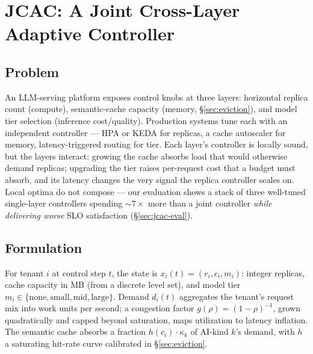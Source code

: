 
\section{JCAC: A Joint Cross-Layer Adaptive Controller}
\label{sec:jcac}

\subsection{Problem}
An LLM-serving platform exposes control knobs at three layers: horizontal
replica count (compute), semantic-cache capacity (memory,
\S\ref{sec:eviction}), and model tier selection (inference cost/quality).
Production systems tune each with an independent controller --- HPA or KEDA
for replicas, a cache autoscaler for memory, latency-triggered routing for
tier. Each layer's controller is locally sound, but the layers interact:
growing the cache absorbs load that would otherwise demand replicas;
upgrading the tier raises per-request cost that a budget must absorb, and
its latency changes the very signal the replica controller scales on.
Local optima do not compose --- our evaluation shows a stack of three
well-tuned single-layer controllers spending ${\sim}7\times$ more than a
joint controller \emph{while delivering worse} SLO satisfaction
(\S\ref{sec:jcac-eval}).

\subsection{Formulation}
For tenant $i$ at control step $t$, the state is
$x_i(t) = (r_i, c_i, m_i)$: integer replicas, cache capacity in MB (from a
discrete level set), and model tier
$m_i \in \{\text{none}, \text{small}, \text{mid}, \text{large}\}$.
Demand $d_i(t)$ aggregates the tenant's request mix into work units per
second; a congestion factor $g(\rho) = (1-\rho)^{-1}$, grown quadratically
and capped beyond saturation, maps utilization to latency inflation. The
semantic cache absorbs a fraction $h(c_i)\cdot\kappa_k$ of AI-kind $k$'s
demand, with $h$ a saturating hit-rate curve calibrated in
\S\ref{sec:eviction}.

